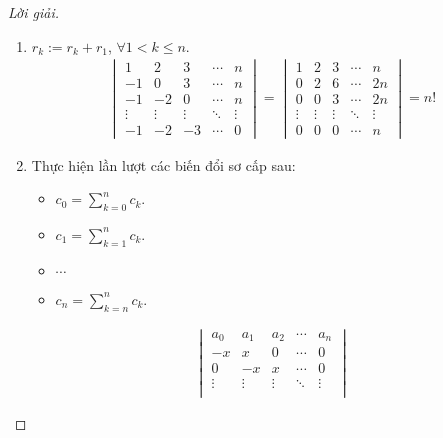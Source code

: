 \documentclass[class=nhvh-linear-algebra,crop=false]{standalone}
\begin{document}
\begin{proof}[Lời giải]
	\begin{enumerate}[label = (\alph*)]
		\item $r_{k}:= r_{k} + r_{1}$, $\forall 1 < k\le n$.
		      \begin{align*}
			      \begin{vmatrix}
				      1      & 2      & 3      & \cdots & n      \\
				      -1     & 0      & 3      & \cdots & n      \\
				      -1     & -2     & 0      & \cdots & n      \\
				      \vdots & \vdots & \vdots & \ddots & \vdots \\
				      -1     & -2     & -3     & \cdots & 0
			      \end{vmatrix}
			      =
			      \begin{vmatrix}
				      1      & 2      & 3      & \cdots & n      \\
				      0      & 2      & 6      & \cdots & 2n     \\
				      0      & 0      & 3      & \cdots & 2n     \\
				      \vdots & \vdots & \vdots & \ddots & \vdots \\
				      0      & 0      & 0      & \cdots & n
			      \end{vmatrix}
			      = n!
		      \end{align*}
		\item Thực hiện lần lượt các biến đổi sơ cấp sau:
		      \begin{itemize}
			      \item $c_{0} = \displaystyle\sum^{n}_{k=0}c_{k}$.
			      \item $c_{1} = \displaystyle\sum^{n}_{k=1}c_{k}$.
			      \item $\cdots$
			      \item $c_{n} = \displaystyle\sum^{n}_{k=n}c_{k}$.
		      \end{itemize}
		      \begingroup{}
		      \allowdisplaybreaks{}
		      \begin{align*}
			      \begin{vmatrix}
				      a_{0}  & a_{1}  & a_{2}  & \cdots & a_{n}  \\
				      -x     & x      & 0      & \cdots & 0      \\
				      0      & -x     & x      & \cdots & 0      \\
				      \vdots & \vdots & \vdots & \ddots & \vdots \\

\end{vmatrix}
\end{align*}
\end{enumerate}
\end{proof}
\end{document}

